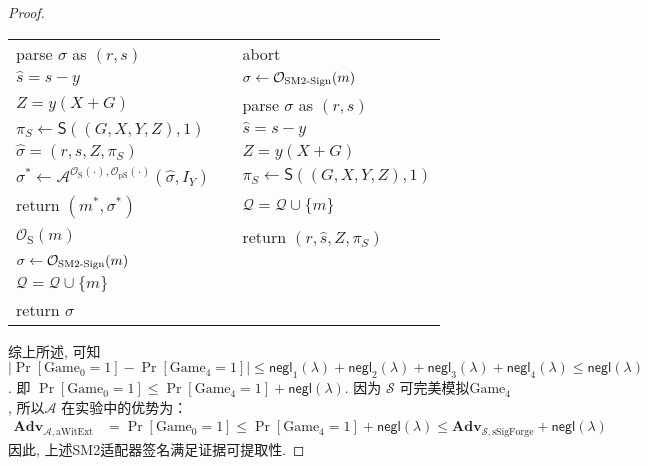 \documentclass[review]{jcr}
\begin{document}
\begin{proof}
\begin{center}
{\begin{tabular}{lll}
parse $\sigma$ as $(r,s)$ &   &   abort  \\

$\hat{s}=s-y$ &   & $\sigma\leftarrow \mathcal{O}_{\text{SM2\text{-}Sign}}(m)$   \\

$Z=y(X+G)$ &   & parse $\sigma$ as $(r,s)$ \\

$\pi_S\leftarrow \mathsf{S}((G,X,Y,Z),1)$ &   & $\hat{s}=s-y$ \\

$\hat{\sigma}=(r,s, Z, \pi_S)$ &   &$Z=y(X+G)$  \\

$\sigma^*\leftarrow \mathcal{A}^{\mathcal{O}_{\text{S}}(\cdot),\mathcal{O}_{\text{pS}}(\cdot)}(\hat{\sigma},I_Y)$ &   & $\pi_S\leftarrow \mathsf{S}((G,X,Y,Z),1)$ \\

return $(m^*, \sigma^*)$ &   & $\mathcal{Q}=\mathcal{Q}\cup \{m\}$  \\

$\mathcal{O}_{\text{S}}(m)$ &   &  return $(r,\hat{s},Z, \pi_S)$  \\
\cline{1-1}

$\sigma\leftarrow \mathcal{O}_{\text{SM2\text{-}Sign}}(m)$ &   &  \\

$\mathcal{Q}=\mathcal{Q}\cup \{m\}$ &   &   \\

return $\sigma$ &   &   \\ 
\end{tabular}}
\end{center}

综上所述, 可知 $|\Pr[\text{Game}_0 = 1] -\Pr[\text{Game}_4 = 1]| \leq \mathsf{negl}_1(\lambda)+\mathsf{negl}_2(\lambda)+\mathsf{negl}_3(\lambda)+\mathsf{negl}_4(\lambda)\leq\mathsf{negl}(\lambda)$. 
即 $\Pr[\text{Game}_0 = 1] \leq\Pr[\text{Game}_4 = 1] +\mathsf{negl}(\lambda)$. 因为 $\mathcal{S}$ 可完美模拟$\text{Game}_4$, 所以$\mathcal{A}$ 在实验中的优势为：
\begin{equation*}
\begin{aligned}
\textbf{Adv}_{\mathcal{A},\text{aWitExt}}& = \Pr[\text{Game}_0 = 1]\leq \Pr[\text{Game}_4=1]+\mathsf{negl}(\lambda)\leq \textbf{Adv}_{\mathcal{S},\text{sSigForge}} + \mathsf{negl}(\lambda)
\end{aligned}
\end{equation*}
因此, 上述SM2适配器签名满足证据可提取性.

\end{proof}
\end{document}

